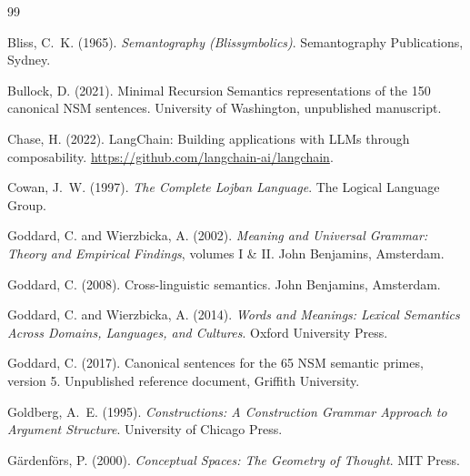 \documentclass[11pt,a4paper]{article}
\begin{document}


\begin{thebibliography}{99}

Bliss, C.~K. (1965).
\newblock \emph{Semantography (Blissymbolics)}.
\newblock Semantography Publications, Sydney.

Bullock, D. (2021).
\newblock Minimal Recursion Semantics representations of the 150 canonical NSM sentences.
\newblock University of Washington, unpublished manuscript.

Chase, H. (2022).
\newblock LangChain: Building applications with LLMs through composability.
\newblock \url{https://github.com/langchain-ai/langchain}.

Cowan, J.~W. (1997).
\newblock \emph{The Complete Lojban Language}.
\newblock The Logical Language Group.

Goddard, C. and Wierzbicka, A. (2002).
\newblock \emph{Meaning and Universal Grammar: Theory and Empirical Findings}, volumes I \& II.
\newblock John Benjamins, Amsterdam.

Goddard, C. (2008).
\newblock Cross-linguistic semantics.
\newblock John Benjamins, Amsterdam.

Goddard, C. and Wierzbicka, A. (2014).
\newblock \emph{Words and Meanings: Lexical Semantics Across Domains, Languages, and Cultures}.
\newblock Oxford University Press.

Goddard, C. (2017).
\newblock Canonical sentences for the 65 NSM semantic primes, version 5.
\newblock Unpublished reference document, Griffith University.

Goldberg, A.~E. (1995).
\newblock \emph{Constructions: A Construction Grammar Approach to Argument Structure}.
\newblock University of Chicago Press.

G{\"a}rdenf{\"o}rs, P. (2000).
\newblock \emph{Conceptual Spaces: The Geometry of Thought}.
\newblock MIT Press.


\end{thebibliography}
\end{document}
